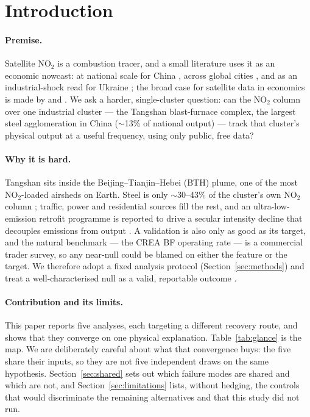 \documentclass[11pt,a4paper]{article}
\providecommand{\ce}[1]{\ensuremath{\mathrm{#1}}}
\begin{document}
\begin{abstract}
\vspace{4pt}\noindent\textbf{Keywords:} tropospheric \ce{NO_2}; TROPOMI; economic nowcasting;
iron and steel; null results; equivalence bounds; source attribution; flux divergence.
\end{abstract}

\section{Introduction}
\label{sec:intro}

\paragraph{Premise.} Satellite \ce{NO_2} is a combustion tracer, and a small literature uses it as
an economic nowcast: at national scale for China
\citep{morris_zhang_2019,li_zheng_2023,li_2024_nox_trends}, across global cities
\citep{montgomery_holloway_2018}, and as an industrial-shock read for Ukraine
\citep{mao_2025_ukraine}; the broad case for satellite data in economics is made by
\citet{donaldson_storeygard_2016} and \citet{ezran_2023}. We ask a harder, single-cluster
question: can the \ce{NO_2} column over one industrial cluster --- the Tangshan blast-furnace
complex, the largest steel agglomeration in China ($\sim$13\% of national output) --- track that
cluster's physical output at a useful frequency, using only public, free data?

\paragraph{Why it is hard.} Tangshan sits inside the Beijing--Tianjin--Hebei (BTH) plume, one of
the most \ce{NO_2}-loaded airsheds on Earth. Steel is only $\sim$30--43\% of the cluster's own
\ce{NO_2} column \citep{wen_2024}; traffic, power and residential sources fill the rest, and an
ultra-low-emission retrofit programme is reported to drive a secular intensity decline that
decouples emissions from output \citep{li_2024_nox_trends}. A validation is also only as good as
its target, and the natural benchmark --- the CREA BF operating rate
\citep{crea_steel_benchmark} --- is a commercial trader survey, so any near-null could be blamed
on either the feature or the target. We therefore adopt a fixed analysis protocol
(Section~\ref{sec:methods}) and treat a well-characterised null as a valid, reportable outcome
\citep{morris_zhang_2019}.

\paragraph{Contribution and its limits.} This paper reports five analyses, each targeting a
different recovery route, and shows that they converge on one physical explanation.
Table~\ref{tab:glance} is the map. We are deliberately careful about what that convergence buys:
the five share their inputs, so they are not five independent draws on the same hypothesis.
Section~\ref{sec:shared} sets out which failure modes are shared and which are not, and
Section~\ref{sec:limitations} lists, without hedging, the controls that would discriminate the
remaining alternatives and that this study did not run.
\end{document}
